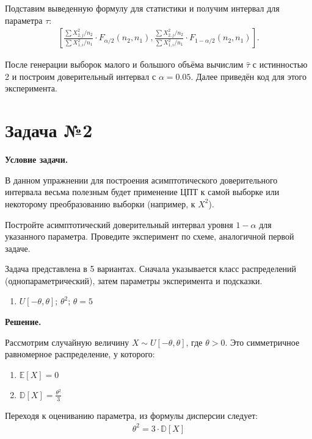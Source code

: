 \documentclass[12pt]{article}
\begin{document}
	Подставим выведенную формулу для статистики и получим интервал для параметра $\tau$:
	\begin{gather*}
		\left[ \frac{\sum X_{2,j}^2 / n_2}{\sum X_{1,i}^2 / n_1} \cdot F_{\alpha/2}(n_2, n_1), \frac{\sum X_{2,j}^2 / n_2}{\sum X_{1,i}^2 / n_1} \cdot F_{1 - \alpha/2}(n_2, n_1) \right].
	\end{gather*}
	
	После генерации выборок малого и большого объёма вычислим $\hat{\tau}$ с истинностью 2 и построим доверительный интервал с $\alpha = 0.05$. Далее приведён код для этого эксперимента.
	
	\section*{Задача №2}
	
	\textbf{Условие задачи.}
	
	В данном упражнении для построения асимптотического доверительного интервала весьма полезным будет применение ЦПТ к самой выборке или некоторому преобразованию выборки (например, к $X^2$).
	
	Постройте асимптотический доверительный интервал уровня $1 - \alpha$ для указанного параметра. Проведите эксперимент по схеме, аналогичной первой задаче.
	
	Задача представлена в 5 вариантах. Сначала указывается класс распределений (однопараметрический), затем параметры эксперимента и подсказки.
	\begin{enumerate}
		\centering
		\setcounter{enumi}{2}
		\item $U[-\theta, \theta]$; $\theta^2$; $\theta = 5$
	\end{enumerate}
	\vspace{1em}
	
	\textbf{Решение.}
	
	Рассмотрим случайную величину $ X \sim U[-\theta, \theta] $, где $ \theta > 0 $. Это симметричное равномерное распределение, у которого:
	\begin{enumerate}
		\item $\mathbb{E}[X] = 0$
		\item $\mathbb{D}[X] = \frac{\theta^2}{3}$
	\end{enumerate}
	
	Переходя к оцениванию параметра, из формулы дисперсии следует:
	\begin{gather*}
		\theta^2 = 3 \cdot \mathbb{D}[X]
	\end{gather*}
	
\end{document}
